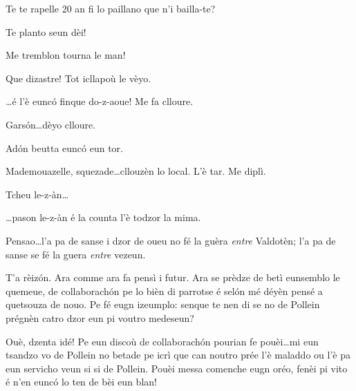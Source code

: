 \begin{drama}
\Pinospeaks{} Te te rapelle 20 an fi lo paillano que n'i bailla-te? 

\Selmospeaks{} Te planto seun dèi!

\Pinospeaks{} Me tremblon tourna le man!


\Dorinaspeaks Que dizastre! Tot icllapoù le vèyo.

\Genespeaks \ldots é l'è eunc\'o finque do-z-aoue! Me fa clloure.

\Genespeaks{} Gars\'on\ldots dèyo clloure.

\Marteunspeaks Ad\'on beutta eunc\'o eun tor.


\Dorinaspeaks{} Mademouazelle, squezade\ldots cllouzèn lo local. L'è tar. Me diplì.


\Genespeaks Tcheu le-z-àn\ldots

\Dorinaspeaks \ldots pason le-z-àn é la counta l'è todzor la mima.

\ridocliou




\Laurentspeaks{} Pensao\ldots l'a pa de sanse i dzor de oueu no fé la guèra \textit{entre} Valdotèn; l'a pa de sanse se fé la guera \textit{entre} vezeun.

\Taniaspeaks T'a rèiz\'on. Ara comme ara fa pensì i futur. Ara se prèdze de betì eunsemblo le quemeue, de collaborach\'on pe lo bièn di parrotse é sel\'on mé déyèn pensé a quetsouza de nouo. Pe fé eugn izeumplo: senque te nen di se no de Pollein prégnèn catro dzor eun pi voutro medeseun?

\Laurentspeaks Ouè, dzenta idé! Pe eun discoù de collaborach\'on pourian fe pouèi\ldots mi eun tsandzo vo de Pollein no betade pe icrì que can noutro prée l'è maladdo ou l'è pa eun servicho veun si si de Pollein. Pouèi messa comenche eugn oréo, fenèi pi vito é n'en eunc\'o lo ten de bèi eun blan!


\end{drama}
